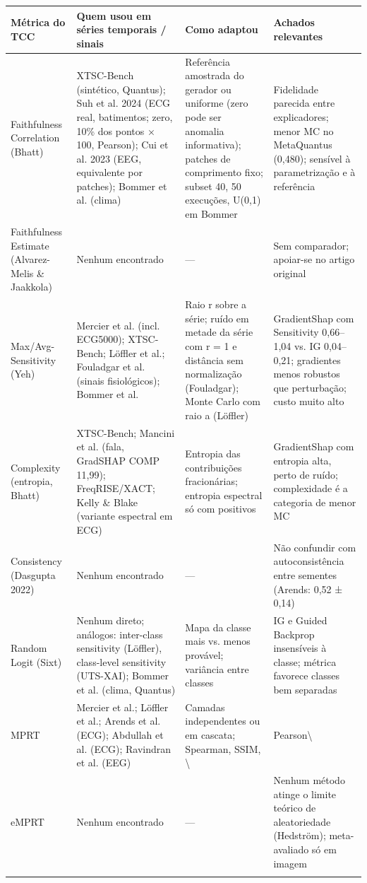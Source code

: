 \documentclass[11pt,a4paper]{article}
\begin{document}
{\scriptsize\setlength{\tabcolsep}{3pt}
\begin{xltabular}{\linewidth}{>{\raggedright\arraybackslash}X>{\raggedright\arraybackslash}X>{\raggedright\arraybackslash}X>{\raggedright\arraybackslash}X}
\toprule
\textbf{Métrica do TCC} & \textbf{Quem usou em séries temporais / sinais} & \textbf{Como adaptou} & \textbf{Achados relevantes} \\
\midrule
\endhead
Faithfulness Correlation (Bhatt) & XTSC-Bench (sintético, Quantus); Suh et al. 2024 (ECG real, batimentos; zero, 10\% dos pontos × 100, Pearson); Cui et al. 2023 (EEG, equivalente por patches); Bommer et al. (clima) & Referência amostrada do gerador ou uniforme (zero pode ser anomalia informativa); patches de comprimento fixo; subset 40, 50 execuções, U(0,1) em Bommer & Fidelidade parecida entre explicadores; menor MC no MetaQuantus (0,480); sensível à parametrização e à referência \\ \addlinespace[1pt]
Faithfulness Estimate (Alvarez-Melis \& Jaakkola) & Nenhum encontrado & — & Sem comparador; apoiar-se no artigo original \\ \addlinespace[1pt]
Max/Avg-Sensitivity (Yeh) & Mercier et al. (incl. ECG5000); XTSC-Bench; Löffler et al.; Fouladgar et al. (sinais fisiológicos); Bommer et al. & Raio r sobre a série; ruído em metade da série com r = 1 e distância sem normalização (Fouladgar); Monte Carlo com raio a (Löffler) & GradientShap com Sensitivity 0,66–1,04 vs. IG 0,04–0,21; gradientes menos robustos que perturbação; custo muito alto \\ \addlinespace[1pt]
Complexity (entropia, Bhatt) & XTSC-Bench; Mancini et al. (fala, GradSHAP COMP 11,99); FreqRISE/XACT; Kelly \& Blake (variante espectral em ECG) & Entropia das contribuições fracionárias; entropia espectral só com positivos & GradientShap com entropia alta, perto de ruído; complexidade é a categoria de menor MC \\ \addlinespace[1pt]
Consistency (Dasgupta 2022) & Nenhum encontrado & — & Não confundir com autoconsistência entre sementes (Arends: 0,52 ± 0,14) \\ \addlinespace[1pt]
Random Logit (Sixt) & Nenhum direto; análogos: inter-class sensitivity (Löffler), class-level sensitivity (UTS-XAI); Bommer et al. (clima, Quantus) & Mapa da classe mais vs. menos provável; variância entre classes & IG e Guided Backprop insensíveis à classe; métrica favorece classes bem separadas \\ \addlinespace[1pt]
MPRT & Mercier et al.; Löffler et al.; Arends et al. (ECG); Abdullah et al. (ECG); Ravindran et al. (EEG) & Camadas independentes ou em cascata; Spearman, SSIM, \textbackslash{} & Pearson\textbackslash{} \\ \addlinespace[1pt]
eMPRT & Nenhum encontrado & — & Nenhum método atinge o limite teórico de aleatoriedade (Hedström); meta-avaliado só em imagem \\ \addlinespace[1pt]
\bottomrule
\end{xltabular}}
\end{document}
